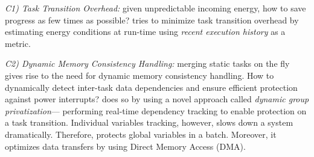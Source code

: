 

\noindent{} \emph{C1) Task Transition Overhead:} given unpredictable incoming energy, how to save progress as few times as possible? \sys tries to minimize task transition overhead by estimating energy conditions at run-time using \emph{recent execution history} as a metric.

\noindent\emph{C2) Dynamic Memory Consistency Handling:} merging static tasks on the fly gives rise to the need for dynamic memory consistency handling. How to dynamically detect inter-task data dependencies and ensure efficient protection against power interrupts? \sys does so by using a novel
approach called \emph{dynamic group privatization}--- %
performing real-time dependency tracking to enable protection on a task transition. Individual variables tracking, however, slows down a system dramatically. Therefore, \sys protects global variables in a batch. Moreover, it optimizes data transfers by using Direct Memory Access (DMA).

